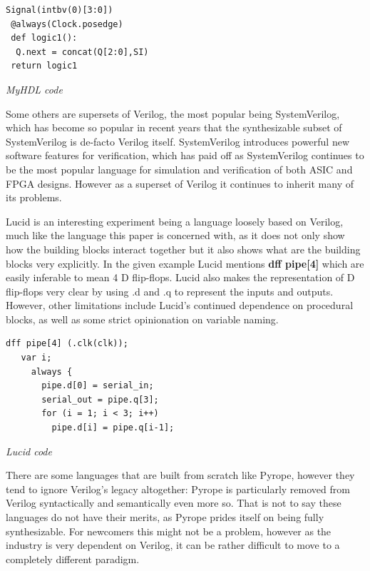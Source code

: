 \documentclass[10pt, two column]{article}
\theoremstyle{definition}
\begin{document}
\begin{lstlisting}
Signal(intbv(0)[3:0])
 @always(Clock.posedge)
 def logic1():
  Q.next = concat(Q[2:0],SI)
 return logic1
\end{lstlisting}
\begin{center}
\textit{MyHDL code}
\end{center}

Some others are supersets of Verilog, the most popular being SystemVerilog, which has become so popular in recent years that the synthesizable subset of SystemVerilog is de-facto Verilog itself. SystemVerilog introduces powerful new software features for verification, which has paid off as SystemVerilog continues to be the most popular language for simulation and verification of both ASIC and FPGA designs\cite{foster_2016}. However as a superset of Verilog it continues to inherit many of its problems.\cite{IEEEstandardforVerilog_UHD_S_VL_2005}\par

Lucid is an interesting experiment being a language loosely based on Verilog, much like the language this paper is concerned with, as it does not only show how the building blocks interact together but it also shows what are the building blocks very explicitly. In the given example Lucid mentions \textbf{dff pipe[4]} which are easily inferable to mean 4 D flip-flops. Lucid also makes the representation of D flip-flops very clear by using .d and .q to represent the inputs and outputs. However, other limitations include Lucid's continued dependence on procedural blocks, as well as some strict opinionation on variable naming\cite{withMojoAndLucid_2017}.\par

\begin{lstlisting}
dff pipe[4] (.clk(clk));
   var i;
     always {
       pipe.d[0] = serial_in;
       serial_out = pipe.q[3];
       for (i = 1; i < 3; i++)
         pipe.d[i] = pipe.q[i-1];
\end{lstlisting}
\begin{center}
\textit{Lucid code}
\end{center}

There are some languages that are built from scratch like Pyrope, however they tend to ignore Verilog's legacy altogether: Pyrope is particularly removed from Verilog syntactically and semantically even more so\cite{Pyrope}. That is not to say these languages do not have their merits, as Pyrope prides itself on being fully synthesizable. For newcomers this might not be a problem, however as the industry is very dependent on Verilog, it can be rather difficult to move to a completely different paradigm.\par
\end{document}
